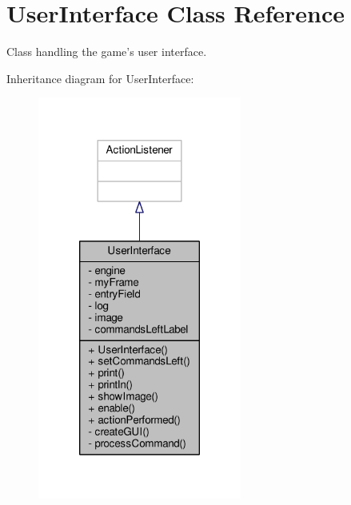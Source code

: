 \hypertarget{classUserInterface}{\section{User\-Interface Class Reference}
\label{classUserInterface}
}


Class handling the game's user interface.  




Inheritance diagram for User\-Interface\-:
\nopagebreak
\begin{figure}[H]
\begin{center}
\leavevmode
\includegraphics[width=190pt]{classUserInterface__inherit__graph}
\end{center}
\end{figure}


